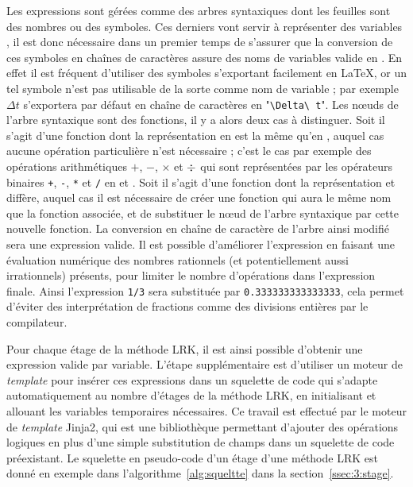 Les expressions \sympy{} sont gérées comme des arbres syntaxiques dont les feuilles sont des nombres ou des symboles. Ces derniers vont servir à représenter des variables \CC, il est donc nécessaire dans un premier temps de s'assurer que la conversion de ces symboles en chaînes de caractères assure des noms de variables valide en \CC. En effet il est fréquent d'utiliser des symboles s'exportant facilement en \LaTeX{}, or un tel symbole n'est pas utilisable de la sorte comme nom de variable ; par exemple $\Delta t$ s'exportera par défaut en chaîne de caractères en "\texttt{\textbackslash Delta\textbackslash\ t}". Les nœuds de l'arbre syntaxique sont des fonctions, il y a alors deux cas à distinguer. Soit il s'agit d'une fonction dont la représentation en \Python{} est la même qu'en \CC, auquel cas aucune opération particulière n'est nécessaire ; c'est le cas par exemple des opérations arithmétiques $+$, $-$, $\times$ et $\divisionsymbol$ qui sont représentées par les opérateurs binaires \texttt{+}, \texttt{-}, \texttt{*} et \texttt{/} en \Python{} et \CC{}. Soit il s'agit d'une fonction dont la représentation \Python{} et \CC{} diffère, auquel cas il est nécessaire de créer une fonction \sympy{} qui aura le même nom que la fonction \CC{} associée, et de substituer le nœud de l'arbre syntaxique par cette nouvelle fonction. La conversion en chaîne de caractère de l'arbre ainsi modifié sera une expression \CC{} valide. Il est possible d'améliorer l'expression \CC{} en faisant une évaluation numérique des nombres rationnels (et potentiellement aussi irrationnels) présents, pour limiter le nombre d'opérations dans l'expression finale. Ainsi l'expression \texttt{1/3} sera substituée par \texttt{0.333333333333333}, cela permet d'éviter des interprétation de fractions comme des divisions entières par le compilateur.

Pour chaque étage de la méthode LRK, il est ainsi possible d'obtenir une expression \CC{} valide par variable. L'étape supplémentaire est d'utiliser un moteur de \emph{template} pour insérer ces expressions dans un squelette de code qui s'adapte automatiquement au nombre d'étages de la méthode LRK, en initialisant et allouant les variables temporaires nécessaires. Ce travail est effectué par le moteur de \emph{template} Jinja2, qui est une bibliothèque \Python{} permettant d'ajouter des opérations logiques en plus d'une simple substitution de champs dans un squelette de code préexistant. Le squelette en pseudo-code d'un étage d'une méthode LRK est donné en exemple dans l'algorithme~\ref{alg:squeltte} dans la section~\ref{ssec:3:stage}.

